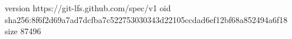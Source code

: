 version https://git-lfs.github.com/spec/v1
oid sha256:8f6f2d69a7ad7dcfba7c522753030343d22105ccdad6ef12bf68a852494a6f18
size 87496
